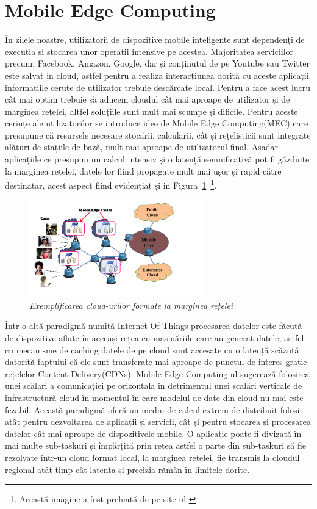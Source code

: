 \documentclass[12pt,a4paper]{report}
\begin{document}
\section{Mobile Edge Computing}
În zilele noastre, utilizatorii de dispozitive mobile inteligente sunt dependenți de execuția și stocarea unor operații intensive pe acestea. Majoritatea serviciilor precum: Facebook, Amazon, Google, dar și conținutul de pe Youtube sau Twitter este salvat in cloud, astfel pentru a realiza interacțiunea dorită cu aceste aplicații informațiile cerute de utilizator trebuie descărcate local. Pentru a face acest lucru cât mai optim trebuie să aducem cloudul cât mai aproape de utilizator și de marginea rețelei, altfel soluțiile sunt mult mai scumpe și dificile. Pentru aceste cerințe ale utilizatorilor se introduce idee de Mobile Edge Computing(MEC) care presupune că resursele necesare stocării, calculării, cât și rețelisticii sunt integrate alături de stațiile de bază, mult mai aproape de utilizatorul final. Așadar aplicațiile ce presupun un calcul intensiv și o latență semnificativă pot fi găzduite la marginea rețelei, datele lor fiind propagate mult mai ușor și rapid către destinatar, acest aspect fiind evidențiat și in Figura~\ref{fig:pic0}~\footnote{Această imagine a fost preluată de pe site-ul \cite{MECPicture} }.
\begin{figure}[th]
\centering
\includegraphics[width=3in]{pics/mobile-edge-computing.jpg}
  \caption{\emph{Exemplificarea cloud-urilor formate la marginea rețelei}}
  \label{fig:pic0}
\end{figure}

Într-o altă paradigmă numită Internet Of Things procesarea datelor este făcută de dispozitive aflate în aceeași rețea cu mașinăriile care au generat datele, astfel cu mecanisme de caching datele de pe cloud sunt accesate cu o latență scăzută datorită faptului că ele sunt transferate mai aproape de punctul de interes grație rețelelor Content Delivery(CDNs). Mobile Edge Computing-ul\cite{MecSurvey} sugerează folosirea unei scălari a comunicației pe orizontală în detrimentul unei scalări verticale de infrastructură cloud în momentul în care modelul de date din cloud nu mai este fezabil. Această paradigmă oferă un mediu de calcul extrem de distribuit folosit atât pentru dezvoltarea de aplicații și servicii, cât și pentru stocarea și procesarea datelor cât mai aproape de dispozitivele mobile. O aplicație poate fi divizată în mai multe sub-taskuri și împărțită prin rețea astfel o parte din sub-taskuri să fie rezolvate într-un cloud format local, la marginea rețelei, fie transmis la cloudul regional atât timp cât latența și precizia rămân în limitele dorite.
\end{document}

